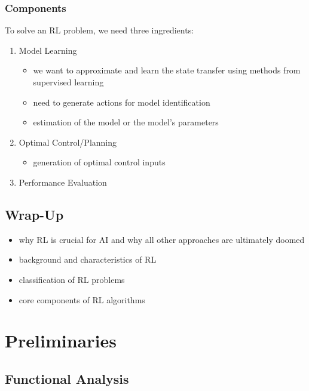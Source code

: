 		\subsection{Components}
			To solve an \ac{RL} problem, we need three ingredients:
			\begin{enumerate}
				\item Model Learning
					\begin{itemize}
						\item we want to approximate and learn the state transfer using methods from supervised learning
						\item need to generate actions for model identification
						\item estimation of the model or the model's parameters
					\end{itemize}
				\item Optimal Control/Planning
					\begin{itemize}
						\item generation of optimal control inputs
					\end{itemize}
				\item Performance Evaluation
			\end{enumerate}

	\section{Wrap-Up}
		\begin{itemize}
			\item why \ac{RL} is crucial for \ac{AI} and why all other approaches are ultimately doomed
			\item background and characteristics of \ac{RL}
			\item classification of \ac{RL} problems
			\item core components of \ac{RL} algorithms
		\end{itemize}

\chapter{Preliminaries} %

	\section{Functional Analysis} %

